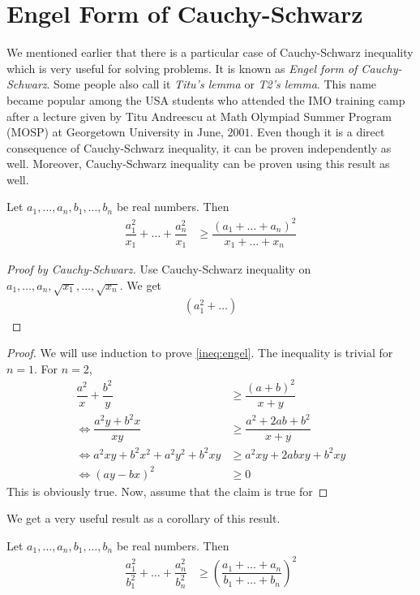 \documentclass{subfile}
\begin{document}
	\chapter{Engel Form of Cauchy-Schwarz}\label{ch:engel}
	We mentioned earlier that there is a particular case of Cauchy-Schwarz inequality which is very useful for solving problems. It is known as \textit{Engel form of Cauchy-Schwarz}. Some people also call it \textit{Titu's lemma} or \textit{T2's lemma}. This name became popular among the USA students who attended the IMO training camp after a lecture given by Titu Andreescu at Math Olympiad Summer Program (MOSP) at Georgetown University in June, $2001$. Even though it is a direct consequence of Cauchy-Schwarz inequality, it can be proven independently as well. Moreover, Cauchy-Schwarz inequality can be proven using this result as well.
		\begin{theorem}\label{thm:engel}
			Let $a_1,\ldots,a_n,b_1,\ldots,b_n$ be real numbers. Then
				\begin{align}
					\dfrac{a_1^2}{x_1}+\ldots+\dfrac{a_n^2}{x_1}
						& \geq\dfrac{(a_1+\ldots+a_n)^2}{x_1+\ldots+x_n}\label{ineq:engel}
				\end{align}
		\end{theorem}
	
		\begin{proof}[Proof by Cauchy-Schwarz]
			Use Cauchy-Schwarz inequality on $a_1,\ldots,a_n,\sqrt{x_1},\ldots,\sqrt{x_n}$. We get
				\begin{align*}
					(a_1^2+\ldots)
				\end{align*}
		\end{proof}
	
		\begin{proof}
			We will use induction to prove \ref{ineq:engel}. The inequality is trivial for $n=1$. For $n=2$,
				\begin{align*}
					\dfrac{a^2}{x}+\dfrac{b^2}{y}
						& \geq\dfrac{(a+b)^2}{x+y}\\
					\iff\dfrac{a^2y+b^2x}{xy}
						& \geq\dfrac{a^2+2ab+b^2}{x+y}\\
					\iff a^2xy+b^2x^2+a^2y^2+b^2xy
						& \geq a^2xy+2abxy+b^2xy\\
					\iff (ay-bx)^2
						& \geq0
				\end{align*}
			This is obviously true. Now, assume that the claim is true for 
		\end{proof}
	We get a very useful result as a corollary of this result.
		\begin{theorem}
			Let $a_1,\ldots,a_n,b_1,\ldots,b_n$ be real numbers. Then
				\begin{align*}
					\dfrac{a_1^2}{b_1^2}+\ldots+\dfrac{a_n^2}{b_n^2}
						& \geq\left(\dfrac{a_1+\ldots+a_n}{b_1+\ldots+b_n}\right)^2
				\end{align*}
		\end{theorem}
	
\end{document}
